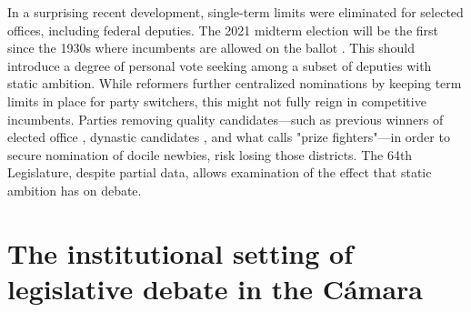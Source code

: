 \documentclass[letter,12pt]{article}
\begin{document}
In a surprising recent development, single-term limits were eliminated for selected offices, including federal deputies. The 2021 midterm election will be the first since the 1930s where incumbents are allowed on the ballot \citep[see][ for details]{magarInstReel.2017}. This should introduce a degree of personal vote seeking among a subset of deputies with static ambition. While reformers further centralized nominations by keeping term limits in place for party switchers, this might not fully reign in competitive incumbents. Parties removing quality candidates---such as previous winners of elected office \citep{jacobson.1997}, dynastic candidates \citep{enriquez-dinastias2018itam}, and what \citet{zallerprizeFighters} calls "prize fighters"---in order to secure nomination of docile newbies, risk losing those districts. The 64th Legislature, despite partial data, allows examination of the effect that static ambition has on debate.

\section{The institutional setting of legislative debate in the Cámara} %


\end{document}
